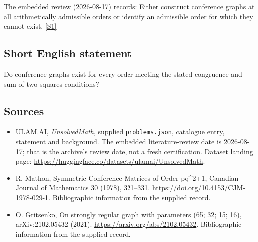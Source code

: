 \documentclass[11pt,a4paper]{article}
\newcommand{\sref}[2]{\hyperlink{source:#1:#2}{[S#2]}}
\begin{document}
The embedded review (2026-08-17) records: Either construct conference graphs at all arithmetically admissible orders or identify an admissible order for which they cannot exist. \sref{statement}{1}

\subsection{Short English statement}

Do conference graphs exist for every order meeting the stated congruence and sum-of-two-squares conditions?

\subsection{Sources}

{\small

\begin{itemize}

\item[\hypertarget{source:statement:1}{S1}] ULAM.AI, \emph{UnsolvedMath}, supplied \texttt{problems.json}, catalogue entry, statement and background. The embedded literature-review date is 2026-08-17; that is the archive’s review date, not a fresh certification. Dataset landing page: \url{https://huggingface.co/datasets/ulamai/UnsolvedMath}.

\item[\hypertarget{source:statement:2}{S2}] R. Mathon, Symmetric Conference Matrices of Order pq\textasciicircum{}2+1, Canadian Journal of Mathematics 30 (1978), 321–331. \url{https://doi.org/10.4153/CJM-1978-029-1}. Bibliographic information from the supplied record.

\item[\hypertarget{source:statement:3}{S3}] O. Gritsenko, On strongly regular graph with parameters (65; 32; 15; 16), arXiv:2102.05432 (2021). \url{https://arxiv.org/abs/2102.05432}. Bibliographic information from the supplied record.

\end{itemize}

}

\label{end:statement}
\end{document}
